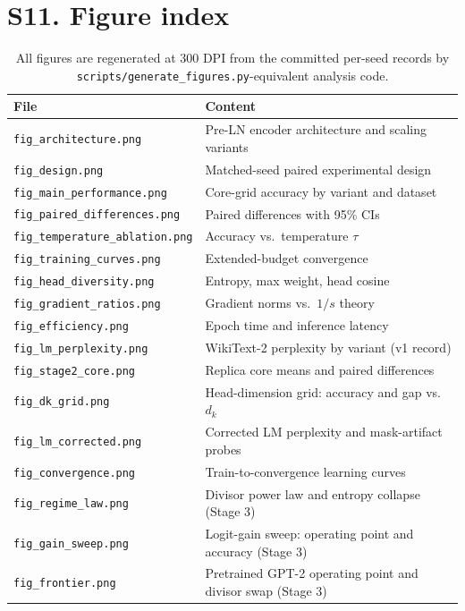\documentclass[10pt,a4paper]{article}
\newcommand{\dk}{d_k}
\begin{document}
\section*{S11. Figure index}\label{sup:figures}
\begin{table}[H]
  \centering
  \caption{All figures are regenerated at 300 DPI from the committed per-seed
  records by \texttt{scripts/generate\_figures.py}-equivalent analysis code.}
  \small
  \begin{tabular}{l l}
    \toprule
    \textbf{File} & \textbf{Content} \\
    \midrule
    \texttt{fig\_architecture.png} & Pre-LN encoder architecture and scaling variants \\
    \texttt{fig\_design.png} & Matched-seed paired experimental design \\
    \texttt{fig\_main\_performance.png} & Core-grid accuracy by variant and dataset \\
    \texttt{fig\_paired\_differences.png} & Paired differences with 95\% CIs \\
    \texttt{fig\_temperature\_ablation.png} & Accuracy vs.\ temperature $\tau$ \\
    \texttt{fig\_training\_curves.png} & Extended-budget convergence \\
    \texttt{fig\_head\_diversity.png} & Entropy, max weight, head cosine \\
    \texttt{fig\_gradient\_ratios.png} & Gradient norms vs.\ $1/s$ theory \\
    \texttt{fig\_efficiency.png} & Epoch time and inference latency \\
    \texttt{fig\_lm\_perplexity.png} & WikiText-2 perplexity by variant (v1 record) \\
    \texttt{fig\_stage2\_core.png} & Replica core means and paired differences \\
    \texttt{fig\_dk\_grid.png} & Head-dimension grid: accuracy and gap vs.\ $\dk$ \\
    \texttt{fig\_lm\_corrected.png} & Corrected LM perplexity and mask-artifact probes \\
    \texttt{fig\_convergence.png} & Train-to-convergence learning curves \\
    \texttt{fig\_regime\_law.png} & Divisor power law and entropy collapse (Stage 3) \\
    \texttt{fig\_gain\_sweep.png} & Logit-gain sweep: operating point and accuracy (Stage 3) \\
    \texttt{fig\_frontier.png} & Pretrained GPT-2 operating point and divisor swap (Stage 3) \\
    \bottomrule
  \end{tabular}
\end{table}
\end{document}

